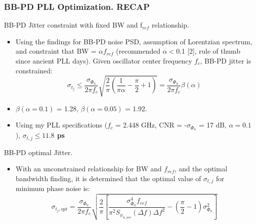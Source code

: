 \documentclass[t, screen, aspectratio=43]{beamer}
\begin{document}
\begin{frame}
	\frametitle{BB-PD PLL Optimization. \color{red}RECAP}
	\begin{block}{BB-PD Jitter constraint with fixed BW and f$_{ref}$ relationship.}
	\tiny
	\begin{itemize}[itemsep=4pt,label=\protect---]
		\item Using the findings for BB-PD noise PSD, assumption of Lorentzian spectrum, and constraint that BW = $\alpha f_{ref}$ (recommended $\alpha$$<$0.1 [2], rule of thumb since ancient PLL days). Given oscillator center frequency $f_c$, BB-PD jitter is constrained:
		\tiny
		\begin{equation}
			\sigma_{t_j} \leq \frac{\sigma_{\Phi_n}}{2\pi f_c}\sqrt{\frac{2}{\pi}\left(\frac{1}{\pi\alpha} - \frac{\pi}{2} + 1\right)} = \frac{\sigma_{\Phi_n}}{2\pi f_c}\beta(\alpha)
		\end{equation}
		\item $\beta(\alpha=0.1)$ = 1.28, $\beta(\alpha=0.05)$ = 1.92.
		\item Using my PLL specifications ($f_c$ = 2.448 GHz, CNR = -$\sigma_{\Phi_n}$ = 17 dB, $\alpha=0.1$), {\color{red}\textbf{$\sigma_{t,j}\leq 11.8 $ ps}}
	\end{itemize}


	\end{block}	
	\begin{block}{BB-PD optimal Jitter.}
	\tiny
	\begin{itemize}[itemsep=4pt,label=\protect---]
		\item With an unconstrained relationship for BW and $f_{ref}$, and the optimal bandwidth finding, it is determined that the optimal value of $\sigma_{t,j}$ for minimum phase noise is:
		\tiny
		\begin{equation}
			\sigma_{t_j,opt} = \frac{\sigma_{\Phi_n}}{2\pi f_c}\sqrt{\frac{2}{\pi}\left[\frac{\sigma^4_{\Phi_n} f_{ref}}{\pi^2 S_{\phi_{n,osc}}(\Delta f) \Delta f^2} - \left(\frac{\pi}{2} - 1\right)\sigma^2_{\Phi_n}\right]}
		\end{equation}

	\end{itemize}


	\end{block}	
\end{frame}
\end{document}
